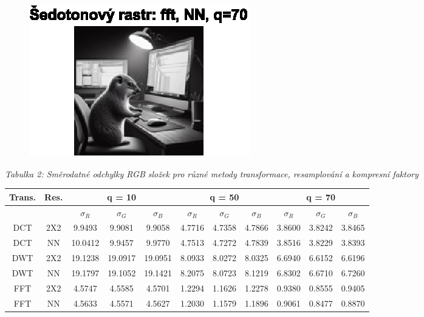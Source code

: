 \begin{figure}[H]
\begin{minipage}[b]{0.3\textwidth}
        \includegraphics[width=\textwidth]{images/sedo_fft_NN_q70.eps}
    \end{minipage}
\end{figure}

\begin{table}[H]
    \centering
    \textit{Tabulka 2: Směrodatné odchylky RGB složek pro různé metody transformace, resamplování a kompresní faktory}
    
    \begin{tabular}{|c|c|c|c|c|c|c|c|c|c|c|}
    \hline
    \textbf{Trans.} & \textbf{Res.} & \multicolumn{3}{c|}{\textbf{q = 10}} & \multicolumn{3}{c|}{\textbf{q = 50}} & \multicolumn{3}{c|}{\textbf{q = 70}} \\
    \hline
    & & \(\sigma_R\) & \(\sigma_G\) & \(\sigma_B\) & \(\sigma_R\) & \(\sigma_G\) & \(\sigma_B\) & \(\sigma_R\) & \(\sigma_G\) & \(\sigma_B\) \\
    \hline
    DCT & 2X2 & 9.9493 & 9.9081 & 9.9058 & 4.7716 & 4.7358 & 4.7866 & 3.8600 & 3.8242 & 3.8465 \\ \hline
    DCT & NN  & 10.0412 & 9.9457 & 9.9770 & 4.7513 & 4.7272 & 4.7839 & 3.8516 & 3.8229 & 3.8393 \\ \hline
    DWT & 2X2 & 19.1238 & 19.0917 & 19.0951 & 8.0933 & 8.0272 & 8.0325 & 6.6940 & 6.6152 & 6.6196 \\ \hline
    DWT & NN  & 19.1797 & 19.1052 & 19.1421 & 8.2075 & 8.0723 & 8.1219 & 6.8302 & 6.6710 & 6.7260 \\ \hline
    FFT & 2X2 & 4.5747 & 4.5585 & 4.5701 & 1.2294 & 1.1626 & 1.2278 & 0.9380 & 0.8555 & 0.9405 \\ \hline
    FFT & NN  & 4.5633 & 4.5571 & 4.5627 & 1.2030 & 1.1579 & 1.1896 & 0.9061 & 0.8477 & 0.8870 \\ \hline
    \end{tabular}
\end{table}